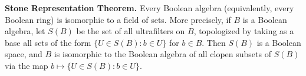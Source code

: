 \textbf{Stone Representation Theorem.} Every Boolean algebra (equivalently, every Boolean ring) is isomorphic to a field of sets. More precisely, if $B$ is a Boolean algebra, let $S(B)$ be the set of all ultrafilters on $B$, topologized by taking as a base all sets of the form $\{U \in S(B) : b \in U\}$ for $b \in B$. Then $S(B)$ is a Boolean space, and $B$ is isomorphic to the Boolean algebra of all clopen subsets of $S(B)$ via the map $b \mapsto \{U \in S(B) : b \in U\}$.
